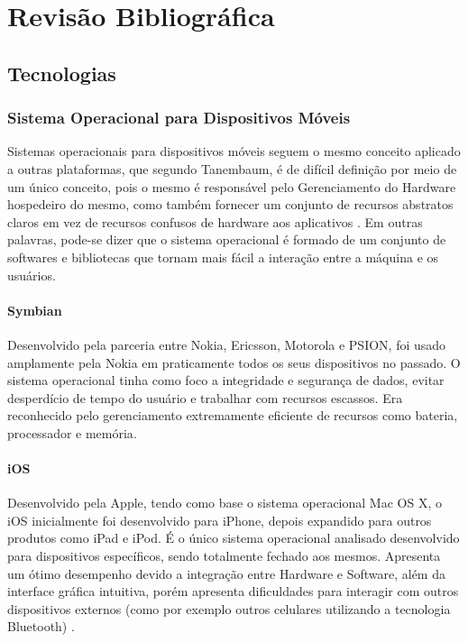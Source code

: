 \chapter{Revisão Bibliográfica}

\section{Tecnologias}

\subsection{Sistema Operacional para Dispositivos Móveis}
Sistemas operacionais para dispositivos móveis seguem o mesmo conceito aplicado a outras plataformas, que segundo Tanembaum, é de difícil definição por meio de um único conceito, pois o mesmo é responsável pelo Gerenciamento do Hardware hospedeiro do mesmo, como também fornecer um conjunto de recursos abstratos claros em vez de recursos confusos de hardware aos aplicativos \cite{tanenbaum2010modern}. Em outras palavras, pode-se dizer que o sistema operacional é formado de um conjunto de softwares e bibliotecas que tornam mais fácil a interação entre a máquina e os usuários.

\subsubsection{Symbian}
Desenvolvido pela parceria entre Nokia, Ericsson, Motorola e PSION, foi usado amplamente pela Nokia em praticamente todos os seus dispositivos no passado. O sistema operacional tinha como foco a integridade e segurança de dados, evitar desperdício de tempo do usuário e trabalhar com recursos escassos. Era reconhecido pelo gerenciamento extremamente eficiente de recursos como bateria, processador e memória\cite{SistemasOperacionaisMoveisComputacao}.

\subsubsection{iOS}
Desenvolvido pela Apple, tendo como base o sistema operacional Mac OS X, o iOS inicialmente foi desenvolvido para iPhone, depois expandido para outros produtos como iPad e iPod. É o único sistema operacional analisado desenvolvido para dispositivos específicos, sendo totalmente fechado aos mesmos. Apresenta um ótimo desempenho devido a integração entre Hardware e Software, além da interface gráfica intuitiva, porém apresenta dificuldades para interagir com outros dispositivos externos (como por exemplo outros celulares utilizando a tecnologia Bluetooth) \cite{AvaliacaoComparativaSOMoveis}.

